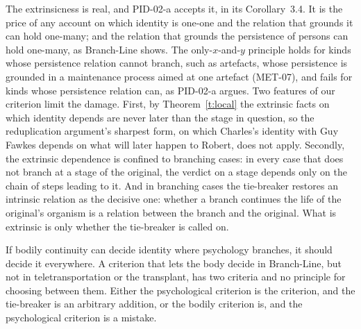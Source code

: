 \documentclass{situationist-preprint}
\begin{document}
\begin{reply}
The extrinsicness is real, and PID-02-a accepts it, in its Corollary~3.4. It is the price of any account on which identity is one-one and the relation that grounds it can hold one-many; and the relation that grounds the persistence of persons can hold one-many, as Branch-Line shows. The only-$x$-and-$y$ principle holds for kinds whose persistence relation cannot branch, such as artefacts, whose persistence is grounded in a maintenance process aimed at one artefact (MET-07), and fails for kinds whose persistence relation can, as PID-02-a argues. Two features of our criterion limit the damage. First, by Theorem~\ref{t:local} the extrinsic facts on which identity depends are never later than the stage in question, so the reduplication argument's sharpest form, on which Charles's identity with Guy Fawkes depends on what will later happen to Robert, does not apply. Secondly, the extrinsic dependence is confined to branching cases: in every case that does not branch at a stage of the original, the verdict on a stage depends only on the chain of steps leading to it. And in branching cases the tie-breaker restores an intrinsic relation as the decisive one: whether a branch continues the life of the original's organism is a relation between the branch and the original. What is extrinsic is only whether the tie-breaker is called on.
\end{reply}

\begin{objection}[Collapse]\label{o:collapse}
If bodily continuity can decide identity where psychology branches, it should decide it everywhere. A criterion that lets the body decide in Branch-Line, but not in teletransportation or the transplant, has two criteria and no principle for choosing between them. Either the psychological criterion is the criterion, and the tie-breaker is an arbitrary addition, or the bodily criterion is, and the psychological criterion is a mistake.
\end{objection}
\end{document}
